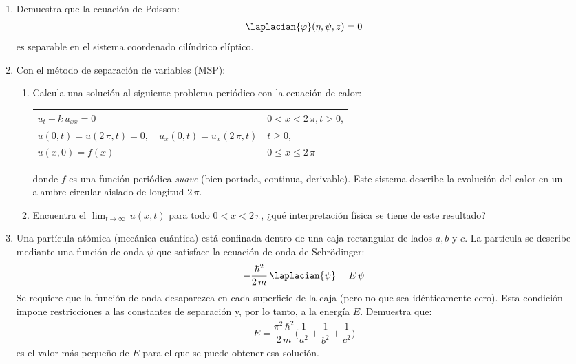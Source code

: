 \begin{enumerate}
\item Demuestra que la ecuación de Poisson:
\begin{align*}
\laplacian{\varphi} (\eta, \psi, z) = 0
\end{align*}
es separable en el sistema coordenado cilíndrico elíptico.
\item Con el método de separación de variables (MSP): 
\begin{enumerate}[label=\roman*)]
\item Calcula una solución al siguiente problema periódico con la ecuación de calor:
\begin{table}[H]
\centering
\large
\begin{tabular}{l l}
$u_{t} - k \, u_{xx} = 0$ & $0 < x < 2 \, \pi,  t > 0$, \\
$u(0, t) = u(2 \, \pi, t) = 0, \quad u_{x} (0, t) = u_{x}(2 \, \pi, t)$ & $t \geq 0$, \\
$u(x, 0) = f(x)$ & $0 \leq x \leq 2 \, \pi$
\end{tabular}
\end{table}
donde $f$ es una función periódica \emph{suave} (bien portada, continua, derivable). Este sistema describe la evolución del calor en un alambre circular aislado de longitud $2 \, \pi$.
\item Encuentra el $\displaystyle{\lim_{t \to \infty}} \, u(x, t)$ para todo $0 < x < 2 \, \pi$, ¿qué interpretación física se tiene de este resultado?
\end{enumerate}
\item Una partícula atómica (mecánica cuántica) está confinada dentro de una caja rectangular de lados $a, b$ y $c$. La partícula se describe mediante una función de onda $\psi$ que satisface la ecuación de onda de Schrödinger:
\begin{align*}
- \dfrac{\hbar^{2}}{2 \, m} \, \laplacian{\psi} = E \, \psi
\end{align*}
Se requiere que la función de onda desaparezca en cada superficie de la caja (pero no que sea idénticamente cero). Esta condición impone restricciones a las constantes de separación y, por lo tanto, a la energía $E$. Demuestra que:
\begin{align*}
E = \dfrac{\pi^{2} \, \hbar^{2}}{2 \, m} \bigg( \dfrac{1}{a^{2}} + \dfrac{1}{b^{2}} + \dfrac{1}{c^{2}} \bigg)
\end{align*}
es el valor más pequeño de $E$ para el que se puede obtener esa solución.

\end{enumerate}
